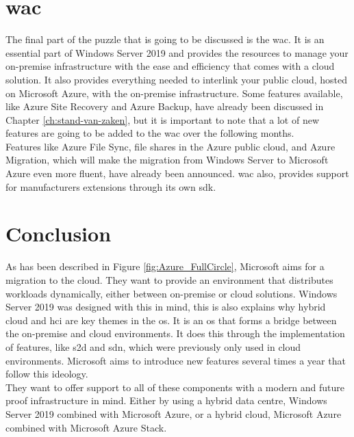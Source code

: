\section{\acrfull{wac}}
The final part of the puzzle that is going to be discussed is the \acrlong{wac}. 
It is an essential part of Windows Server 2019 and provides the resources to manage your on-premise infrastructure with the ease and efficiency that comes with a cloud solution. 
It also provides everything needed to interlink your public cloud, hosted on Microsoft Azure, with the on-premise infrastructure. 
Some features available, like Azure Site Recovery and Azure Backup, have already been discussed in Chapter \ref{ch:stand-van-zaken}, but it is important to note that a lot of new features are going to be added to the \acrlong{wac} over the following months. \autocite{Singh2019} 
\\
Features like Azure File Sync, file shares in the Azure public cloud, and Azure Migration, which will make the migration from Windows Server to Microsoft Azure even more fluent, have already been announced. 
\acrlong{wac} also, provides support for manufacturers extensions through its own \acrfull{sdk}. 	

\section{Conclusion}
As has been described in Figure \ref{fig:Azure_FullCircle}, Microsoft aims for a migration to the cloud. 
They want to provide an environment that distributes workloads dynamically, either between on-premise or cloud solutions. 
Windows Server 2019 was designed with this in mind, this is also explains why hybrid cloud and \acrshort{hci} are key themes in the \acrshort{os}. 
It is an \acrshort{os} that forms a bridge between the on-premise and cloud environments. 
It does this through the implementation of features, like \acrfull{s2d} and \acrfull{sdn}, which were previously only used in cloud environments. 
Microsoft aims to introduce new features several times a year that follow this ideology.
\\
They want to offer support to all of these components with a modern and future proof infrastructure in mind. 
Either by using a hybrid data centre, Windows Server 2019 combined with Microsoft Azure, or a hybrid cloud, Microsoft Azure combined with Microsoft Azure Stack.